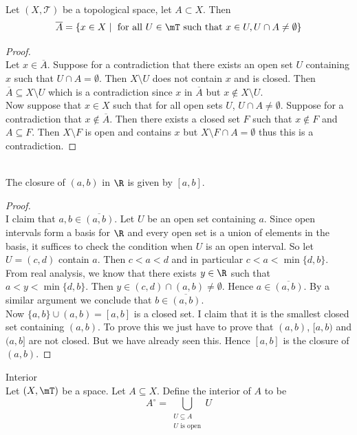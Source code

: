 \documentclass[a4paper]{article}
\begin{document}
\begin{prp}{}{}\\
Let $(X,\mathcal{T})$ be a topological space, let $A\subset X$. Then $$\overline{A}=\{x\in X\;|\;\text{ for all }U\in\mT\text{ such that }x\in U,U\cap A\neq\emptyset\}$$ 
\begin{proof}\\
Let $x\in\overline{A}$. Suppose for a contradiction that there exists an open set $U$ containing $x$ such that $U\cap A=\emptyset$. Then $X\setminus U$ does not contain $x$ and is closed. Then $\overline{A}\subseteq X\setminus U$ which is a contradiction since $x$ in $\overline{A}$ but $x\notin X\setminus U$. \\
Now suppose that $x\in X$ such that for all open sets $U$, $U\cap A\neq\emptyset$. Suppose for a contradiction that $x\notin\overline{A}$. Then there exists a closed set $F$ such that $x\notin F$ and $A\subseteq F$. Then $X\setminus F$ is open and contains $x$ but $X\setminus F\cap A=\emptyset$ thus this is a contradiction. 
\end{proof}
\end{prp}

\begin{eg}{}{}\\
The closure of $(a,b)$ in $\R$ is given by $[a,b]$. 
\begin{proof}\\
I claim that $a,b\in\overline{(a,b)}$. Let $U$ be an open set containing $a$. Since open intervals form a basis for $\R$ and every open set is a union of elements in the basis, it suffices to check the condition when $U$ is an open interval. So let $U=(c,d)$ contain $a$. Then $c<a<d$ and in particular $c<a<\min\{d,b\}$. From real analysis, we know that there exists $y\in\R$ such that $a<y<\min\{d,b\}$. Then $y\in(c,d)\cap(a,b)\neq\emptyset$. Hence $a\in\overline{(a,b)}$. By a similar argument we conclude that $b\in\overline{(a,b)}$. \\

Now $\{a,b\}\cup(a,b)=[a,b]$ is a closed set. I claim that it is the smallest closed set containing $(a,b)$. To prove this we just have to prove that $(a,b)$, $[a,b)$ and $(a,b]$ are not closed. But we have already seen this. Hence $[a,b]$ is the closure of $(a,b)$. 
\end{proof}
\end{eg}

\begin{defn}{Interior}{}\\
Let $(X,\mT)$ be a space. Let $A\subseteq X$. Define the interior of $A$ to be $$A^\circ=\bigcup_{\substack{U\subseteq A\\U\text{ is open}}}U$$
\end{defn}
\end{document}
